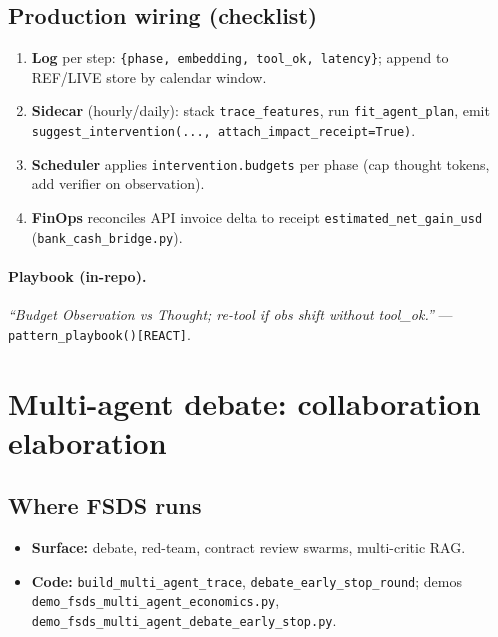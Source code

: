 \documentclass[11pt]{article}
\begin{document}
\subsection{Production wiring (checklist)}
\begin{enumerate}
  \item \textbf{Log} per step: \texttt{\{phase, embedding, tool\_ok, latency\}}; append to REF/LIVE store by calendar window.
  \item \textbf{Sidecar} (hourly/daily): stack \texttt{trace\_features}, run \texttt{fit\_agent\_plan}, emit \texttt{suggest\_intervention(..., attach\_impact\_receipt=True)}.
  \item \textbf{Scheduler} applies \texttt{intervention.budgets} per phase (cap thought tokens, add verifier on observation).
  \item \textbf{FinOps} reconciles API invoice delta to receipt \texttt{estimated\_net\_gain\_usd} (\texttt{bank\_cash\_bridge.py}).
\end{enumerate}

\paragraph{Playbook (in-repo).}
\textit{``Budget Observation vs Thought; re-tool if obs shift without tool\_ok.''} --- \texttt{pattern\_playbook()[REACT]}.

\section{Multi-agent debate: collaboration elaboration}
\label{sec:multiagent-practical}

\subsection{Where FSDS runs}
\begin{itemize}[nosep]
  \item \textbf{Surface:} debate, red-team, contract review swarms, multi-critic RAG.
  \item \textbf{Code:} \texttt{build\_multi\_agent\_trace}, \texttt{debate\_early\_stop\_round}; demos \texttt{demo\_fsds\_multi\_agent\_economics.py}, \texttt{demo\_fsds\_multi\_agent\_debate\_early\_stop.py}.
\end{itemize}
\end{document}
